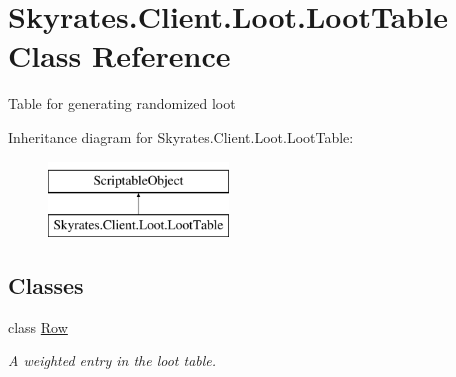 \hypertarget{class_skyrates_1_1_client_1_1_loot_1_1_loot_table}{\section{Skyrates.\-Client.\-Loot.\-Loot\-Table Class Reference}
\label{class_skyrates_1_1_client_1_1_loot_1_1_loot_table}
}


Table for generating randomized loot  


Inheritance diagram for Skyrates.\-Client.\-Loot.\-Loot\-Table\-:\begin{figure}[H]
\begin{center}
\leavevmode
\includegraphics[height=2.000000cm]{class_skyrates_1_1_client_1_1_loot_1_1_loot_table}
\end{center}
\end{figure}
\subsection*{Classes}
\begin{DoxyCompactItemize}
\item 
class \hyperlink{class_skyrates_1_1_client_1_1_loot_1_1_loot_table_1_1_row}{Row}
\begin{DoxyCompactList}\small\item\em A weighted entry in the loot table. \end{DoxyCompactList}\end{DoxyCompactItemize}
